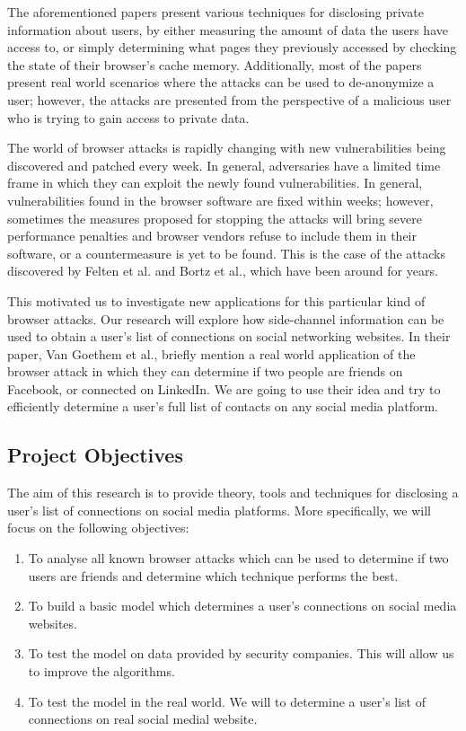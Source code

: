 \documentclass[a4paper,11pt]{article}
\begin{document}
The aforementioned papers present various techniques for disclosing private information about users, by either measuring the amount of data the users have access to, or simply determining what pages they previously accessed by checking the state of their browser's cache memory. Additionally, most of the papers present real world scenarios where the attacks can be used to de-anonymize a user; however, the attacks are presented from the perspective of a malicious user who is trying to gain access to private data.

The world of browser attacks is rapidly changing with new vulnerabilities being discovered and patched every week. In general, adversaries have a limited time frame in which they can exploit the newly found vulnerabilities. In general, vulnerabilities found in the browser software are fixed within weeks; however, sometimes the measures proposed for stopping the attacks will bring severe performance penalties and browser vendors refuse to include them in their software, or a countermeasure is yet to be found. This is the case of the attacks discovered by Felten et al.\cite{felten2000timing} and Bortz et al.\cite{bortz2007exposing}, which have been around for years. 

This motivated us to investigate new applications for this particular kind of browser attacks. Our research will explore how side-channel information can be used to obtain a user's list of connections on social networking websites. In their paper, Van Goethem et al.\cite{van2015clock}, briefly mention a real world application of the browser attack in which they can determine if two people are friends on Facebook, or connected on LinkedIn. We are going to use their idea and try to efficiently determine a user's full list of contacts on any social media platform.


\subsection*{Project Objectives}

The aim of this research is to provide theory, tools and techniques for disclosing a user's list of connections on social media platforms. More specifically, we will focus on the following objectives:
\begin{enumerate}
\item To analyse all known browser attacks which can be used to determine if two users are friends and determine which technique performs the best.
\item To build a basic model which determines a user's connections on social media websites. 
\item To test the model on data provided by security companies. This will allow us to improve the algorithms.
\item To test the model in the real world. We will to determine a user's list of connections on real social medial website.
\end{enumerate}
\end{document}
